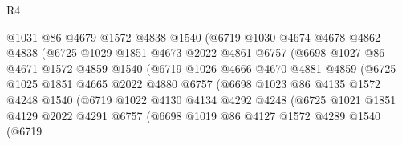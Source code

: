 \begin{lexlean}{R4}
\begin{coremodule}
                        @1031
                        @86
                        @4679
                        @1572
                        @4838
                        @1540
                        (@6719
                          @1030
                          @4674
                          @4678
                          @4862
                          @4838
                          (@6725
                            @1029
                            @1851
                            @4673
                            @2022
                            @4861
                            @6757
                            (@6698
                              @1027
                              @86
                              @4671
                              @1572
                              @4859
                              @1540
                              (@6719
                                @1026
                                @4666
                                @4670
                                @4881
                                @4859
                                (@6725
                                  @1025
                                  @1851
                                  @4665
                                  @2022
                                  @4880
                                  @6757
                                  (@6698
                                    @1023
                                    @86
                                    @4135
                                    @1572
                                    @4248
                                    @1540
                                    (@6719
                                      @1022
                                      @4130
                                      @4134
                                      @4292
                                      @4248
                                      (@6725
                                        @1021
                                        @1851
                                        @4129
                                        @2022
                                        @4291
                                        @6757
                                        (@6698
                                          @1019
                                          @86
                                          @4127
                                          @1572
                                          @4289
                                          @1540
                                          (@6719

\end{coremodule}
\end{lexlean}
